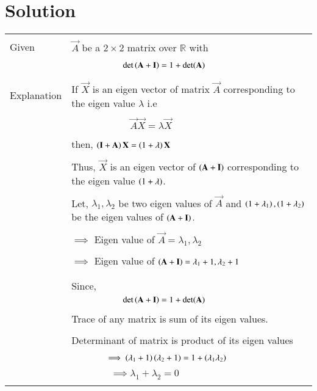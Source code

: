 \documentclass[journal,12pt]{IEEEtran}
\begin{document}
\section{\textbf{Solution}}
\renewcommand{\thetable}{1}
\begin{longtable}{|p{5cm}|p{13cm}|}
\hline
    \multirow{3}{*}{Given} 
    &\\
     & $\vec{A}$ be a $2\times2$ matrix over $\mathbb{R}$ with\\
     &\\
      &$\qquad\qquad \qquad \det\left(\mathbf{A}+\mathbf{I}\right)=1+\det(\mathbf{A})$\\
      &\\
     \hline
     \multirow{3}{*}{Explanation} &\\
     & If $\vec{X}$ is an eigen vector of matrix $\vec{A}$
     corresponding to the eigen value $\lambda$ i.e \\
     &\\
     & $\qquad\qquad\qquad\vec{A}\vec{X}=\lambda\vec{X}$\\
     &\\
     & then, $\left(\mathbf{I}+\mathbf{A}\right)\mathbf{X}=\left(1+\lambda\right)\mathbf{X}$\\
     &\\
     &Thus, $\vec{X}$ is an eigen vector of $\left(\mathbf{A}+\mathbf{I}\right)$ corresponding to the eigen value $\left(1+\lambda\right)$.\\
     
     &\\
     
     & Let, $\lambda_1,\lambda_2$ be two eigen values of $\vec{A}$ and $\left(1+\lambda_1\right),\left(1+\lambda_2\right)$ be the eigen values of $\left(\mathbf{A}+\mathbf{I}\right).$\\
    &\\
    & $\implies$ Eigen value of $\vec{A}=\lambda_1,\lambda_2$\\
    &\\
    &  $\implies$ Eigen value of $\left(\mathbf{A}+\mathbf{I}\right) = \lambda_1+1,\lambda_2+1$\\
    &\\
    \hline
    &\\
    & Since,\\
    &$\qquad\qquad \qquad \det\left(\mathbf{A}+\mathbf{I}\right)=1+\det(\mathbf{A})$\\
    &\\
     & Trace of any matrix is sum of its eigen values. \\
    &\\
    & Determinant of matrix is product of its eigen values \\
    &\\
    & $\qquad\qquad\implies \left(\lambda_1+1\right)\left(\lambda_2+1\right)=1+\left(\lambda_1\lambda_2\right)$\\
    &\\
    &$\qquad\qquad\implies\boxed{ \lambda_1+\lambda_2 = 0}$\\
    &\\
   

\end{longtable}
\end{document}

